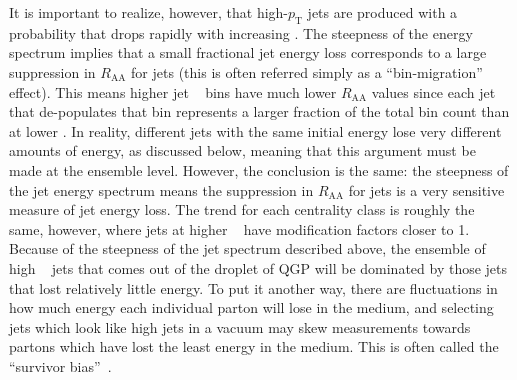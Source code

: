   It is important to realize, however, that high-$p_\mathrm{T}$ jets are produced with a probability that drops rapidly with increasing \pT \cite{Acharya2020}. The steepness of the energy spectrum implies that a small fractional jet energy loss corresponds to a large suppression in $R_\mathrm{AA}$ for jets (this is often referred simply as a ``bin-migration'' effect). This means higher jet \pT~ bins have much lower $R_\mathrm{AA}$ values since each jet that de-populates that bin represents a larger fraction of the total bin count than at lower \pT. In reality, different jets with the same initial energy lose very different amounts of energy, as discussed below, meaning that this argument must be made at the ensemble level. However, the conclusion is the same: the steepness of the jet energy spectrum means the suppression in $R_\mathrm{AA}$ for jets is a very sensitive measure of jet energy loss. 
  The trend for each centrality class is roughly the same, however, where jets at higher \pT~ have modification factors closer to 1. Because of the steepness of the jet spectrum described above, the ensemble of high \pT~ jets that comes out of the droplet of QGP will be dominated by those jets that lost relatively little energy. To put it another way, there are fluctuations in how much energy each individual parton will lose in the medium, and selecting jets which look like high \pt jets in a vacuum may skew measurements towards partons which have lost the least energy in the medium. This is often called the ``survivor bias''~\cite{Connors2018}.

